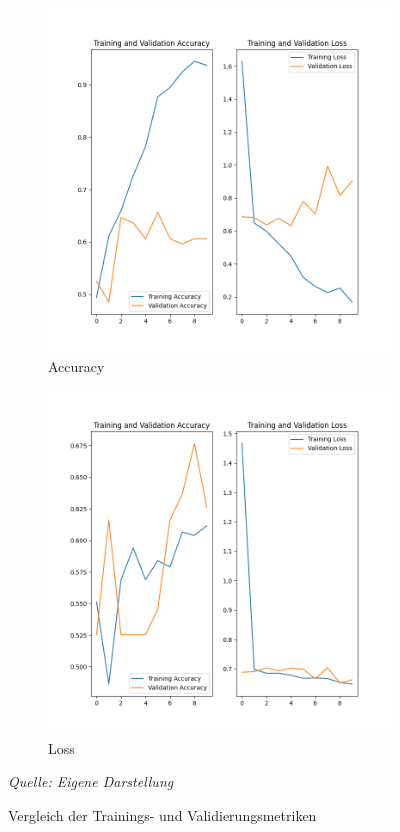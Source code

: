 \begin{figure}[!h]
    \centering
    \begin{subfigure}[b]{0.49\textwidth}
        \includegraphics[width=\textwidth]{abbildungen/acc_train_val.png}
        \caption {Accuracy}
        \label{fig:metricsTrainAcc}
    \end{subfigure}
    \begin{subfigure}[b]{0.49\textwidth}
        \includegraphics[width=\textwidth]{abbildungen/loss_train_val.png}
        \caption {Loss}
        \label{fig:metricsTrainLoss}
    \end{subfigure}
    \caption {Vergleich der Trainings- und Validierungsmetriken}
    \label{fig:metricsTrain}
    \textit{Quelle: Eigene Darstellung}
    \\
\end{figure}

